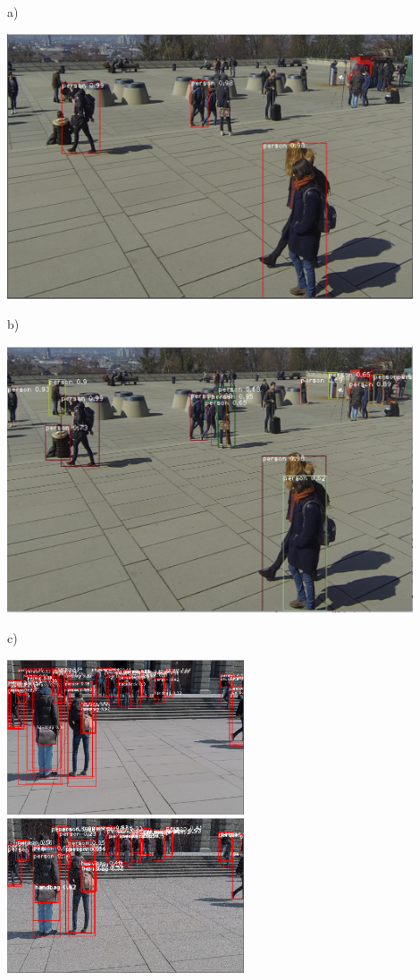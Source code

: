 \documentclass[12pt]{report}
\begin{document}
a)

\includegraphics[width=120mm]{./images/appendix/image298confidence.PNG}

b)

\includegraphics[width=120mm]{./images/appendix/NMS0.6.PNG}

c)

\includegraphics[width=70mm]{./images/appendix/NoConfidenceNoAug.PNG}
\includegraphics[width=70mm]{./images/appendix/NoConfidenceAug10.PNG}
\end{document}
